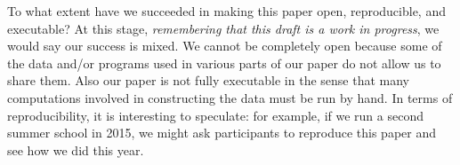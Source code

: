 To what extent have we succeeded in making this paper open, reproducible, and executable?  At this stage,
\emph{remembering that this draft is a work in progress}, we would say our success is mixed.  We cannot be completely open because
some of the data and/or programs used in various parts of our paper do not allow us to share them.  Also our paper is not fully executable in the sense that many 
computations involved in constructing the data must be run by hand.   In terms of reproducibility, it is interesting to speculate: for example, if we run a second summer school in 2015, we might ask participants to reproduce this paper and see how we did this year.





